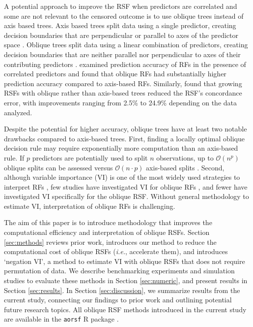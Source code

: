 \documentclass[12pt]{article}\usepackage[]{graphicx}\usepackage[]{xcolor}
\newcommand{\ie}{\textit{i.e.}}
\newcommand{\secref}[1]{Section \ref{#1}}
\begin{document}
A potential approach to improve the RSF when predictors are correlated and some are not relevant to the censored outcome is to use oblique trees instead of axis based trees. Axis based trees split data using a single predictor, creating decision boundaries that are perpendicular or parallel to axes of the predictor space \citep[see][Chapter~2]{breiman2017classification}. Oblique trees split data using a linear combination of predictors, creating decision boundaries that are neither parallel nor perpendicular to axes of their contributing predictors \citep[see][Chapter~5]{breiman2017classification}. \citet{menze2011oblique} examined prediction accuracy of RFs in the presence of correlated predictors and found that oblique RFs had substantially higher prediction accuracy compared to axis-based RFs. Similarly, \citet{jaeger2019oblique} found that growing RSFs with oblique rather than axis-based trees reduced the RSF's concordance error, with improvements ranging from 2.5\% to 24.9\% depending on the data analyzed.

Despite the potential for higher accuracy, oblique trees have at least two notable drawbacks compared to axis-based trees. First, finding a locally optimal oblique decision rule may require exponentially more computation than an axis-based rule. If $p$ predictors are potentially used to split $n$ observations, up to $\mathcal{O}(n^p)$ oblique splits can be assessed versus $\mathcal{O}(n \cdot p)$ axis-based splits \citep{heath1993induction, murthy1994system}. Second, although variable importance (VI) is one of the most widely used strategies to interpret RFs \citep{ishwaran2019standard}, few studies have investigated VI for oblique RFs \citep[see][Section~5]{menze2011oblique}, and fewer have investigated VI specifically for the oblique RSF. Without general methodology to estimate VI, interpretation of oblique RFs is challenging.

The aim of this paper is to introduce methodology that improves the computational efficiency and interpretation of oblique RSFs. \secref{sec:methods} reviews prior work, introduces our method to reduce the computational cost of oblique RSFs (\ie, accelerate them), and introduces `negation VI', a method to estimate VI with oblique RSFs that does not require permutation of data. We describe benchmarking experiments and simulation studies to evaluate these methods in \secref{sec:numeric}, and present results in \secref{sec:results}. In \secref{sec:discussion}, we summarize results from the current study, connecting our findings to prior work and outlining potential future research topics. All oblique RSF methods introduced in the current study are available in the \texttt{aorsf} R package \citep{jaeger2022aorsf}.
\end{document}
